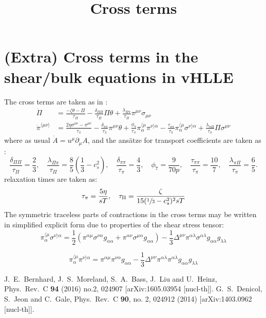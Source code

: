 \documentclass{revtex4}
\title{Cross terms}
\newcommand{\dd}{\partial}
\begin{document}
\maketitle

\section{(Extra) Cross terms in the shear/bulk equations in vHLLE}


The cross terms are taken as in \cite{Bernhard:2016tnd}:
 \begin{align}\label{eqns1}
 \dot\Pi &= \frac{-\zeta\theta-\Pi}{\tau_\Pi}-\frac{\delta_{\Pi\Pi}}{\tau_\Pi}\Pi\theta+
   \frac{\lambda_{\Pi\pi}}{\tau_\Pi}\pi^{\mu\nu}\sigma_{\mu\nu} \\
 \dot\pi^{\langle\mu\nu\rangle} &= \frac{2\eta\sigma^{\mu\nu}-\pi^{\mu\nu}}{\tau_\pi}-
   \frac{\delta_{\pi\pi}}{\tau_\pi}\pi^{\mu\nu}\theta + \frac{\phi_7}{\tau_\pi}\pi_\alpha^{\langle\mu}\pi^{\nu\rangle\alpha}-\frac{\tau_{\pi\pi}}{\tau_\pi}\pi_\alpha^{\langle\mu}\sigma^{\nu\rangle\alpha} + \frac{\lambda_{\pi\Pi}}{\tau_\pi}\Pi\sigma^{\mu\nu}
 \end{align}
where as usual $\dot A=u^\mu \dd_\mu A$, and the ans\"atze for transport coefficients are taken as \cite{Denicol:2014vaa}:
$$\frac{\delta_{\Pi\Pi}}{\tau_\Pi}=\frac 2 3,\quad
\frac{\lambda_{\Pi\pi}}{\tau_\Pi}=\frac 8 5 \left(\frac 1 3 - c_s^2\right), \quad
\frac{\delta_{\pi\pi}}{\tau_\pi}=\frac 4 3,\quad
\phi_7 = \frac{9}{70 p},\quad
\frac{\tau_{\pi\pi}}{\tau_\pi}=\frac{10}{7},\quad
\frac{\lambda_{\pi\Pi}}{\tau_\pi}=\frac 6 5.$$
relaxation times are taken as:
$$\tau_\pi=\frac{5\eta}{sT},\quad \tau_\Pi=\frac{\zeta}{15(\sfrac{1}{3}-c_s^2)^2 sT}$$
The symmetric traceless parts of contractions in the cross terms may be written in simplified explicit form due to properties of the shear stress tensor:
$$\pi_\alpha^{\langle\mu}\sigma^{\nu\rangle\alpha}=\frac 1 2 \left(
\pi^{\alpha\mu}\sigma^{\nu\alpha}g_{\alpha\alpha}+\pi^{\alpha\nu}\sigma^{\mu\alpha}g_{\alpha\alpha}\right)
-\frac 1 3 \Delta^{\mu\nu}\pi^{\alpha\lambda}\sigma^{\alpha\lambda}g_{\alpha\alpha}g_{\lambda\lambda}$$

$$ \pi_\alpha^{\langle\mu}\pi^{\nu\rangle\alpha}=\pi^{\alpha\mu}\pi^{\nu\alpha}g_{\alpha\alpha}
-\frac 1 3 \Delta^{\mu\nu}\pi^{\alpha\lambda}\pi^{\alpha\lambda}g_{\alpha\alpha}g_{\lambda\lambda} $$
\begin{thebibliography}{0}
  J.~E.~Bernhard, J.~S.~Moreland, S.~A.~Bass, J.~Liu and U.~Heinz,
  Phys.\ Rev.\ C {\bf 94} (2016) no.2,  024907
  [arXiv:1605.03954 [nucl-th]].
  G.~S.~Denicol, S.~Jeon and C.~Gale,
  Phys.\ Rev.\ C {\bf 90}, no. 2, 024912 (2014)
  [arXiv:1403.0962 [nucl-th]].
\end{thebibliography}
\end{document}

